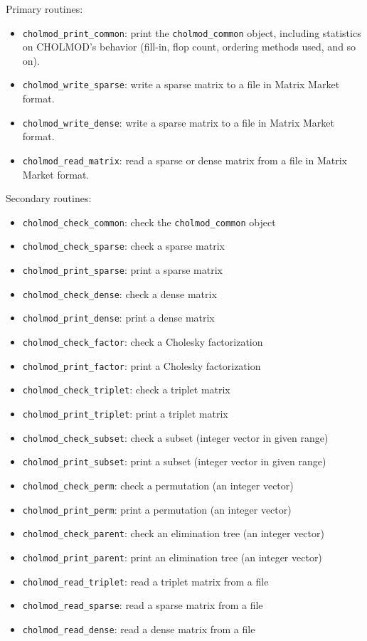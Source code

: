 \documentclass[11pt]{article}
\begin{document}
\vspace{0.1in}
\noindent Primary routines:
    \begin{itemize}
    \item {\tt cholmod\_print\_common}: print the {\tt cholmod\_common} object,
	including statistics on CHOLMOD's behavior (fill-in, flop count,
	ordering methods used, and so on).
    \item {\tt cholmod\_write\_sparse}: write a sparse matrix to a file
	in Matrix Market format.
    \item {\tt cholmod\_write\_dense}: write a sparse matrix to a file
	in Matrix Market format.
    \item {\tt cholmod\_read\_matrix}: read a sparse or dense matrix from a file
	in Matrix Market format.
    \end{itemize}

\vspace{0.1in}
\noindent Secondary routines:
    \begin{itemize}
    \item {\tt cholmod\_check\_common}: check the {\tt cholmod\_common} object
    \item {\tt cholmod\_check\_sparse}: check a sparse matrix
    \item {\tt cholmod\_print\_sparse}: print a sparse matrix
    \item {\tt cholmod\_check\_dense}: check a dense matrix
    \item {\tt cholmod\_print\_dense}: print a dense matrix
    \item {\tt cholmod\_check\_factor}: check a Cholesky factorization
    \item {\tt cholmod\_print\_factor}: print a Cholesky factorization
    \item {\tt cholmod\_check\_triplet}: check a triplet matrix
    \item {\tt cholmod\_print\_triplet}: print a triplet matrix
    \item {\tt cholmod\_check\_subset}: check a subset (integer vector in given range)
    \item {\tt cholmod\_print\_subset}: print a subset (integer vector in given range)
    \item {\tt cholmod\_check\_perm}: check a permutation (an integer vector)
    \item {\tt cholmod\_print\_perm}: print a permutation (an integer vector)
    \item {\tt cholmod\_check\_parent}: check an elimination tree (an integer vector)
    \item {\tt cholmod\_print\_parent}: print an elimination tree (an integer vector)
    \item {\tt cholmod\_read\_triplet}: read a triplet matrix from a file
    \item {\tt cholmod\_read\_sparse}: read a sparse matrix from a file
    \item {\tt cholmod\_read\_dense}: read a dense matrix from a file
    \end{itemize}
\end{document}
